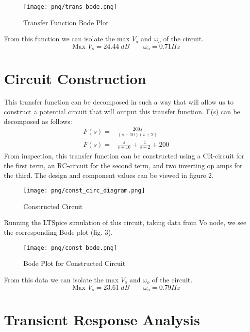 \documentclass[16pt]{article}
\begin{document}
\begin{figure}[H]
    \centering
    \texttt{[image: png/trans\_bode.png]}
    \caption{Transfer Function Bode Plot}
    \label{fig:Transfer Function Bode Plot}
\end{figure}
From this function we can isolate the max $V_o$ and $\omega_o$ of the circuit.
$$\text{Max }V_o = 24.44\;dB\qquad \omega_o = 0.71 Hz$$


\section*{\textcolor{mycolor}{Circuit Construction}}
This transfer function can be decomposed in such a way that will allow us to construct a potential circuit that will output this transfer function. F(s) can be decomposed as follows:
\begin{align*}
    F(s) =& \frac{200s}{(s+10)(s+2)}\\
    F(s) =& \frac{s}{s+10}+\frac{1}{s+2}+200
\end{align*}
From inspection, this transfer function can be constructed using a CR-circuit for the first term, an RC-circuit for the second term, and two inverting
op amps for the third. The design and component values can be viewed in figure 2.
\begin{figure}[H]
    \centering
    \texttt{[image: png/const\_circ\_diagram.png]}
    \caption{Constructed Circuit}
    \label{fig:Constructed Circuit}
\end{figure}
Running the LTSpice simulation of this circuit, taking data from Vo node, we see the corresponding Bode plot (fig. 3).
\begin{figure}[H]
    \centering
    \texttt{[image: png/const\_bode.png]}
    \caption{Bode Plot for Constructed Circuit}
    \label{fig:Bode Constructed Circuit}
\end{figure}
From this data we can isolate the max $V_o$ and $\omega_o$ of the circuit.
$$\text{Max }V_o = 23.61\;dB\qquad \omega_o = 0.79 Hz$$

\section*{\textcolor{mycolor}{Transient Response Analysis}}
\end{document}
